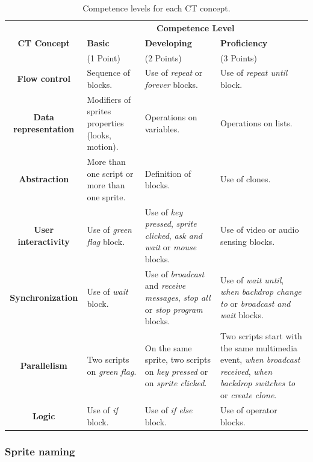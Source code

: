   \begin{table}
    \begin{center}
    \begin{tabular}{|c|p{4cm}|p{4cm}|p{4cm}|}
    \hline
     & \multicolumn{3}{|c|}{\textbf{Competence Level}} \\ \cline{2-4}
    \textbf{CT Concept} & \textbf{Basic} & \textbf{Developing} & \textbf{Proficiency} \\ 
    & (1 Point) & (2 Points) & (3 Points) \\ \hline  
    \textbf{Flow control} & Sequence of blocks. & Use of \textit{repeat} or \textit{forever} blocks. & Use of \textit{repeat until} block. \\ \hline
    \textbf{Data representation} & Modifiers of sprites properties (looks, motion). & Operations on variables. & Operations on lists. \\ \hline
    \textbf{Abstraction} & More than one script or more than one sprite. & Definition of blocks. & Use of clones. \\ \hline
    \textbf{User interactivity} & Use of \textit{green flag} block. & Use of \textit{key pressed}, \textit{sprite clicked}, \textit{ask and wait} or \textit{mouse} blocks. & Use of video or audio sensing blocks. \\ \hline
    \textbf{Synchronization} & Use of \textit{wait} block. & Use of \textit{broadcast} and \textit{receive messages}, \textit{stop all} or \textit{stop program} blocks. & Use of \textit{wait until}, \textit{when backdrop change to} or \textit{broadcast and wait} blocks. \\ \hline
    \textbf{Parallelism} & Two scripts on \textit{green flag}. & On the same sprite, two scripts on \textit{key pressed} or on \textit{sprite clicked}. & Two scripts start with the same multimedia event, \textit{when broadcast received}, \textit{when backdrop switches to} or \textit{create clone}. \\ \hline
    \textbf{Logic} & Use of \textit{if} block. & Use of \textit{if else} block. & Use of operator blocks. \\ \hline
  \end{tabular}
  \caption{Competence levels for each CT concept.}
  \label{table:competence_level}
 \end{center}
\end{table}

\subsubsection{Sprite naming}
\label{subsubsec:sprite_naming}

